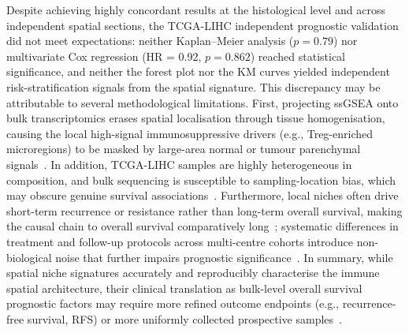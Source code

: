 \documentclass[12pt, a4paper]{article}
\begin{document}
Despite achieving highly concordant results at the histological level and across independent spatial sections, the TCGA-LIHC independent prognostic validation did not meet expectations: neither Kaplan--Meier analysis ($p = 0.79$) nor multivariate Cox regression (HR = 0.92, $p = 0.862$) reached statistical significance, and neither the forest plot nor the KM curves yielded independent risk-stratification signals from the spatial signature. This discrepancy may be attributable to several methodological limitations. First, projecting ssGSEA onto bulk transcriptomics erases spatial localisation through tissue homogenisation, causing the local high-signal immunosuppressive drivers (e.g., Treg-enriched microregions) to be masked by large-area normal or tumour parenchymal signals~\citep{svensson2018spatiallyvariable,gao2020loss}. In addition, TCGA-LIHC samples are highly heterogeneous in composition, and bulk sequencing is susceptible to sampling-location bias, which may obscure genuine survival associations~\citep{zhang2019landscape}. Furthermore, local niches often drive short-term recurrence or resistance rather than long-term overall survival, making the causal chain to overall survival comparatively long~\citep{zhang2019landscape}; systematic differences in treatment and follow-up protocols across multi-centre cohorts introduce non-biological noise that further impairs prognostic significance~\citep{liu2018tcga}. In summary, while spatial niche signatures accurately and reproducibly characterise the immune spatial architecture, their clinical translation as bulk-level overall survival prognostic factors may require more refined outcome endpoints (e.g., recurrence-free survival, RFS) or more uniformly collected prospective samples~\citep{liu2018tcga}.
\end{document}
